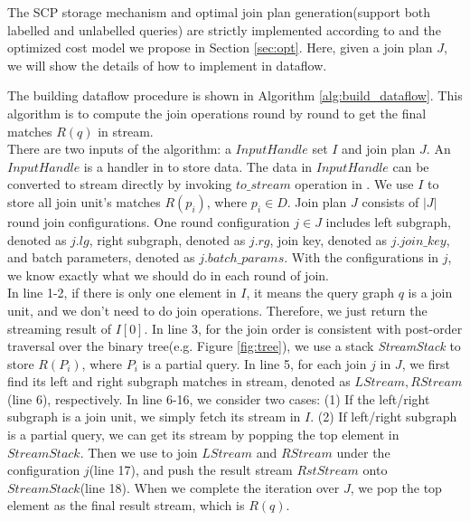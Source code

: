   The SCP storage mechanism and optimal join plan generation(support both labelled and unlabelled queries) are strictly implemented according to \cite{Lai2016} and the optimized cost model we propose in Section \ref{sec:opt}. Here, given a join plan $J$, we will show the details of how to implement \gencliqjoin in \timely dataflow. 

 The building \timely dataflow procedure is shown in Algorithm \ref{alg:build_dataflow}. This algorithm is to compute the join operations round by round to get the final matches $R(q)$ in stream.\\

There are two inputs of the algorithm: a $InputHandle$ set $I$ and join plan $J$. An $InputHandle$ is a handler in \timely to store data. The data in $InputHandle$ can be converted to stream directly by invoking $to\_stream$ operation in \timely. We use $I$ to store all join unit's matches $R(p_i)$, where $p_i \in D$. Join plan $J$ consists of $|J|$ round join configurations. One round configuration $j\in J$ includes left subgraph, denoted as $j.lg$, right subgraph, denoted as $j.rg$, join key, denoted as $j.join\_key$, and batch parameters, denoted as $j.batch\_params$. With the configurations in $j$, we know exactly what we should do in each round of join. \\

In line 1-2, if there is only one element in $I$, it means the query graph $q$ is a join unit, and we don't need to do join operations. Therefore, we just return the streaming result of $I[0]$. In line 3, for the join order is consistent with post-order traversal over the binary tree(e.g. Figure \ref{fig:tree}), we use a stack \textit{StreamStack} to store $R(P_i)$, where $P_i$ is a partial query. In line 5, for each join $j$ in $J$, we first find its left and right subgraph matches in stream, denoted as $LStream, RStream$(line 6), respectively. In line 6-16, we consider two cases: (1) If the left/right subgraph is a join unit, we simply fetch its stream in $I$. (2) If left/right subgraph is a partial query, we can get its stream by popping the top element in $StreamStack$. Then we use  to join $LStream$ and $RStream$ under the configuration $j$(line 17), and push the result stream $RstStream$ onto $StreamStack$(line 18). When we complete the iteration over $J$, we pop the top element as the final result stream, which is $R(q)$.

